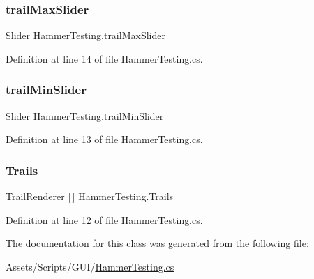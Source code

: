 \subsubsection{\texorpdfstring{trail\+Max\+Slider}{trailMaxSlider}}
{\footnotesize\ttfamily Slider Hammer\+Testing.\+trail\+Max\+Slider}



Definition at line 14 of file Hammer\+Testing.\+cs.

\mbox{\label{class_hammer_testing_aac5b10cc4e17df2ce8f7d00356c12fdc}} 
\subsubsection{\texorpdfstring{trail\+Min\+Slider}{trailMinSlider}}
{\footnotesize\ttfamily Slider Hammer\+Testing.\+trail\+Min\+Slider}



Definition at line 13 of file Hammer\+Testing.\+cs.

\mbox{\label{class_hammer_testing_a1e00270a486d1726c36ac96a659567b9}} 
\subsubsection{\texorpdfstring{Trails}{Trails}}
{\footnotesize\ttfamily Trail\+Renderer \mbox{[}$\,$\mbox{]} Hammer\+Testing.\+Trails}



Definition at line 12 of file Hammer\+Testing.\+cs.



The documentation for this class was generated from the following file\+:\begin{DoxyCompactItemize}
\item 
Assets/\+Scripts/\+G\+U\+I/\mbox{\hyperlink{_hammer_testing_8cs}{Hammer\+Testing.\+cs}}\end{DoxyCompactItemize}
